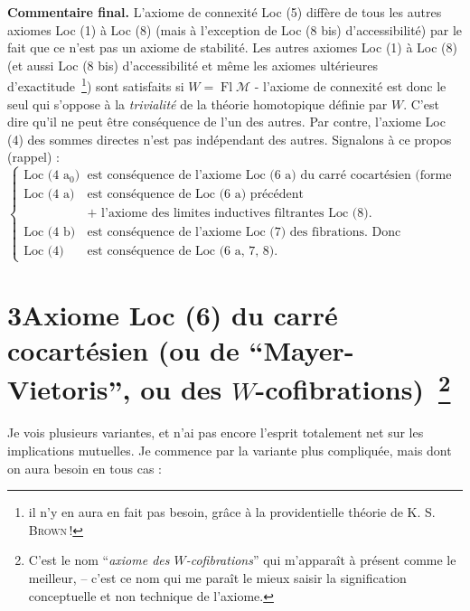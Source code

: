 \documentclass[11pt]{article}
\newcommand{\printedpage}[1]{\marginpar{\footnotesize p.~#1}}
\newcommand{\msp}[1]{\marginpar{\footnotesize [#1]}}
\newcommand{\Fl}{\operatorname{Fl}}
\begin{document}
\textbf{Commentaire final.} L'axiome de connexité Loc (5) diffère de tous les autres axiomes Loc (1) à Loc (8) (mais à l'exception de Loc (8 bis) d'accessibilité) par le fait que ce n'est pas un axiome de stabilité. Les autres axiomes Loc (1) à Loc (8) (et aussi Loc (8 bis) d'accessibilité et même les axiomes ultérieures %
d'exactitude~\footnote[7]{il n'y en aura en fait pas besoin, grâce à la providentielle théorie de K. S. \textsc{Brown}\,!}) sont satisfaits si $W=\Fl\mathcal{M}$ - l'axiome de connexité est donc le seul qui s'oppose à la \textit{trivialité} de la théorie homotopique définie par $W$. C'est dire qu'il ne peut être conséquence de l'un des autres. Par contre, l'axiome Loc (4) des sommes directes n'est pas indépendant des autres. Signalons à ce propos (rappel) :
\[
\left\{
\begin{array}{rl}
\text{Loc (4 a$_0$)} & \text{est conséquence de l'axiome Loc (6 a) du carré cocartésien (forme directe).}\\[1ex]
\text{Loc (4 a)} & \text{est conséquence de Loc (6 a) précédent}\\
 & \text{+ l'axiome des limites inductives filtrantes Loc (8).}\\[3ex]
\text{Loc (4 b)} & \text{est conséquence de l'axiome Loc (7) des fibrations. Donc}\\[1ex]
\text{Loc (4)} & \text{est conséquence de Loc (6 a, 7, 8).}
\end{array}
\right.
\]

\printedpage{12}
\msp{16$'$}

\section*{3\quad Axiome Loc (6) du carré cocartésien (ou de “Mayer-Vietoris”, ou des $W$-cofibrations)~\footnote[8]{C'est le nom “\textit{axiome des $W$-cofibrations}” qui m'apparaît à présent comme le meilleur, -- c'est ce nom qui me paraît le mieux saisir la signification conceptuelle et non technique de l'axiome.}}

Je vois plusieurs variantes, et n'ai pas encore l'esprit totalement net sur les implications mutuelles. Je commence par la variante plus compliquée, mais dont on aura besoin en tous cas :
\end{document}
